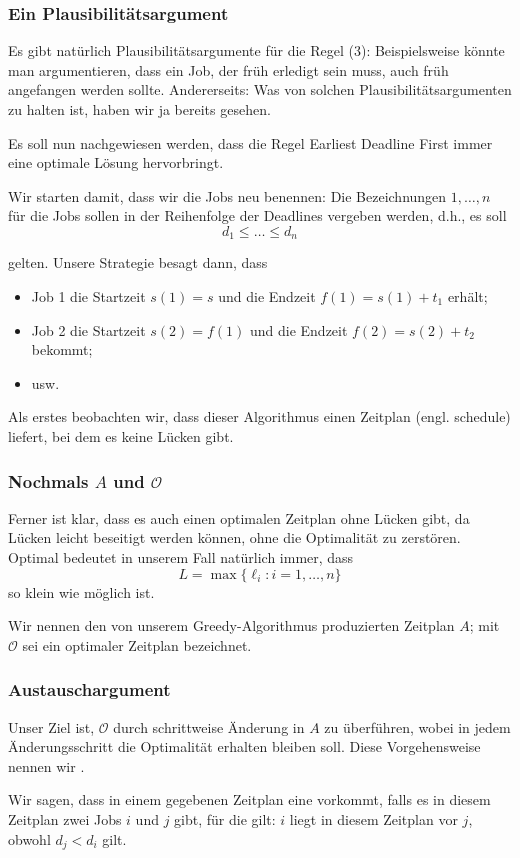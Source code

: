 \documentclass[smaller]{beamer}
\begin{document}
\begin{frame}
 \frametitle{Ein Plausibilitätsargument}
 Es gibt natürlich \alert{Plausibilitätsargumente} für die Regel (3): Beispielsweise könnte man argumentieren, dass ein Job, der früh erledigt sein muss, auch früh angefangen werden sollte. Andererseits: Was von solchen Plausibilitätsargumenten zu halten ist, haben wir ja bereits gesehen. \\ \vspace*{0.2cm}

Es soll nun \alert{nachgewiesen} werden, dass die Regel \alert{Earliest Deadline First} immer eine optimale Lösung hervorbringt. \\ \vspace*{0.2cm}

Wir starten damit, dass wir die Jobs neu benennen: Die Bezeichnungen $1,\ldots,n$ für die Jobs sollen in der Reihenfolge der Deadlines vergeben werden, d.h., es soll
\[
d_1 \leq \ldots \leq d_n
\]

gelten. Unsere Strategie besagt dann, dass
\begin{itemize}
\item Job 1 die Startzeit $s(1)=s$ und die Endzeit $f(1)=s(1)+t_1$ erhält;
\item Job 2 die Startzeit $s(2) = f(1)$ und die Endzeit $f(2) = s(2) + t_2$ bekommt;
\item usw. 
\end{itemize}
Als erstes beobachten wir, dass dieser Algorithmus einen Zeitplan (engl. schedule) liefert, bei dem es \alert{keine Lücken} gibt.
\end{frame}

\begin{frame}
 \frametitle{Nochmals $A$ und $\mathcal{O}$}
 Ferner ist klar, dass es auch einen optimalen Zeitplan ohne Lücken gibt, da Lücken leicht beseitigt werden können, ohne die Optimalität zu zerstören. Optimal bedeutet in unserem Fall natürlich immer, dass 
 $$L=\max{\bigl\{ \ell_i : i = 1,\ldots,n \bigr\}}$$
 so klein wie möglich ist. \\ \vspace*{0.2cm}

Wir nennen den von unserem Greedy-Algorithmus produzierten Zeitplan $A$; mit $\mathcal{O}$ sei ein optimaler Zeitplan bezeichnet.
\end{frame}

\begin{frame}
 \frametitle{Austauschargument}
Unser Ziel ist, $\mathcal{O}$ durch schrittweise Änderung in $A$ zu überführen, wobei \alert{in jedem Änderungsschritt die Optimalität erhalten bleiben soll.} Diese Vorgehensweise nennen wir . \\ \vspace*{0.2cm}

Wir sagen, dass in einem gegebenen Zeitplan eine  vorkommt, falls es in diesem Zeitplan zwei Jobs $i$ und $j$ gibt, für die gilt: $i$ liegt in diesem Zeitplan vor $j$, obwohl $d_j < d_i$ gilt.
\end{frame}
\end{document}
